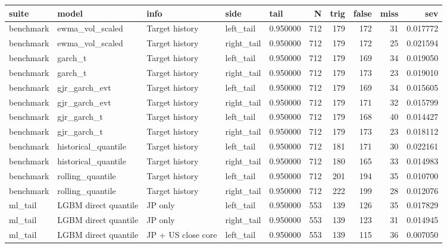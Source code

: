 \begin{tabular}{lllllrrrrr}
\toprule
suite & model & info & side & tail & N & trig & false & miss & sev \\
\midrule
benchmark & ewma\_vol\_scaled & Target history & left\_tail & 0.950000 & 712 & 179 & 172 & 31 & 0.017772 \\
benchmark & ewma\_vol\_scaled & Target history & right\_tail & 0.950000 & 712 & 179 & 172 & 25 & 0.021594 \\
benchmark & garch\_t & Target history & left\_tail & 0.950000 & 712 & 179 & 169 & 34 & 0.019050 \\
benchmark & garch\_t & Target history & right\_tail & 0.950000 & 712 & 179 & 173 & 23 & 0.019010 \\
benchmark & gjr\_garch\_evt & Target history & left\_tail & 0.950000 & 712 & 179 & 169 & 34 & 0.015605 \\
benchmark & gjr\_garch\_evt & Target history & right\_tail & 0.950000 & 712 & 179 & 171 & 32 & 0.015799 \\
benchmark & gjr\_garch\_t & Target history & left\_tail & 0.950000 & 712 & 179 & 168 & 40 & 0.014427 \\
benchmark & gjr\_garch\_t & Target history & right\_tail & 0.950000 & 712 & 179 & 173 & 23 & 0.018112 \\
benchmark & historical\_quantile & Target history & left\_tail & 0.950000 & 712 & 181 & 171 & 30 & 0.022161 \\
benchmark & historical\_quantile & Target history & right\_tail & 0.950000 & 712 & 180 & 165 & 33 & 0.014983 \\
benchmark & rolling\_quantile & Target history & left\_tail & 0.950000 & 712 & 201 & 194 & 35 & 0.010700 \\
benchmark & rolling\_quantile & Target history & right\_tail & 0.950000 & 712 & 222 & 199 & 28 & 0.012076 \\
ml\_tail & LGBM direct quantile & JP only & left\_tail & 0.950000 & 553 & 139 & 126 & 35 & 0.017829 \\
ml\_tail & LGBM direct quantile & JP only & right\_tail & 0.950000 & 553 & 139 & 123 & 31 & 0.014945 \\
ml\_tail & LGBM direct quantile & JP + US close core & left\_tail & 0.950000 & 553 & 139 & 115 & 36 & 0.007050 \\

\end{tabular}
